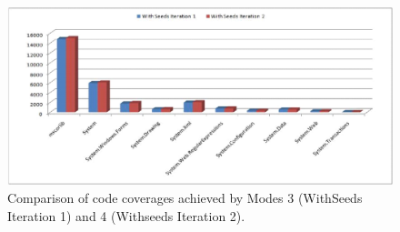 \begin{figure}[t]
\centering
\includegraphics[scale=0.70,clip]{figs/RQ4_2_1.eps}\vspace*{-1ex}
\caption{\label{fig:rq42}Comparison of code coverages achieved by Modes 3 (WithSeeds Iteration 1) and 4 (Withseeds Iteration 2).}
\end{figure}



